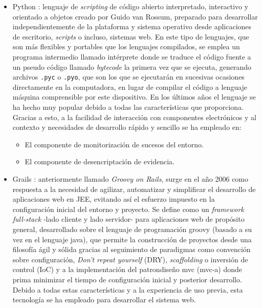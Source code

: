 \documentclass[12pt,a4paper, twoside]{report}
\begin{document}
\begin{itemize}
		\item Python \cite{python}: lenguaje de \textit{scripting} de código abierto interpretado, interactivo y orientado a objetos creado por Guido van Rossum, preparado para desarrollar independientemente de la plataforma y sistema operativo desde aplicaciones de escritorio, \textit{\glspl{script}} o incluso, sistemas web. En este tipo de lenguajes, que son más flexibles y portables que los lenguajes compilados, se emplea un programa intermedio llamado intérprete donde se traduce el código fuente a un pseudo código llamado \textit{bytecode} la primera vez que se ejecuta, generando archivos \texttt{.pyc} o \texttt{.pyo}, que son los que se ejecutarán en sucesivas ocasiones directamente en la computadora, en lugar de compilar el código a lenguaje máquina comprensible por este dispositivo. En los últimos años el lenguaje se ha hecho muy popular debido a todas las características que proporciona. Gracias a esto, a la facilidad de interacción con componentes electrónicos y al contexto y necesidades de desarrollo rápido y sencillo se ha empleado en:
		
		\begin{itemize}
			\item El componente de monitorización de sucesos del entorno.
			\item El componente de desencriptación de evidencia.
		\end{itemize}

		\item Grails \cite{grails}: anteriormente llamado \textit{Groovy on Rails}, surge en el año 2006 como respuesta a la necesidad de agilizar, automatizar y simplificar el desarrollo de aplicaciones web en JEE, evitando así el esfuerzo impuesto en la configuración inicial del entorno y proyecto. Se define como un \textit{\gls{framework}} \textit{full-stack} -lado cliente y lado servidor- para aplicaciones web de propósito general, desarrollado sobre el lenguaje de programación \gls{groovy} (basado a su vez en el lenguaje \gls{java}), que permite la construcción de proyectos desde una filosofía ágil y sólida gracias al seguimiento de paradigmas como convención sobre configuración, \textit{Don’t repeat yourself} (DRY), \textit{\gls{scaffolding}} o inversión de control (IoC) y a la implementación del \gls{patrondiseño} \gls{mvc} (\gls{mvc-a}) donde prima minimizar el tiempo de configuración inicial y posterior desarrollo. Debido a todas estas características y a la experiencia de uso previa, esta tecnología se ha empleado para desarrollar el sistema web.

	\end{itemize}
			
\end{document}
